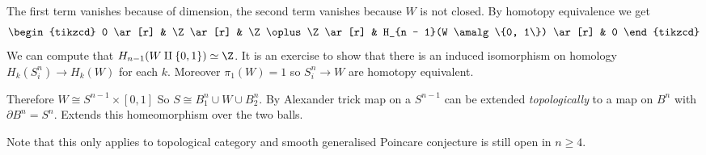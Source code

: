 \documentclass[a4paper]{article}
\renewcommand{\boundary}{\partial}
\begin{document}
The first term vanishes because of dimension, the second term vanishes because \(W\) is not closed. By homotopy equivalence we get
\[
  \begin{tikzcd}
    0 \ar[r] & \Z \ar[r] & \Z \oplus \Z \ar[r] & H_{n - 1}(W \amalg \{0, 1\}) \ar[r] & 0
  \end{tikzcd}
\]
We can compute that \(H_{n - 1}(W \amalg \{0, 1\}) \simeq \Z\). It is an exercise to show that there is an induced isomorphism on homology \(H_k(S^n_i) \to H_k(W)\) for each \(k\). Moreover \(\pi_1(W) = 1\) so \(S^n_i \to W\) are homotopy equivalent.

Therefore \(W \cong S^{n - 1} \times [0, 1]\) So \(S \cong B_1^n \cup W \cup B_2^n\). By Alexander trick map on a \(S^{n - 1}\) can be extended \emph{topologically} to a map on \(B^n\) with \(\boundary B^n = S^n\). Extends this homeomorphism over the two balls.

Note that this only applies to topological category and smooth generalised Poincare conjecture is still open in \(n \geq 4\).






\printindex
\end{document}
